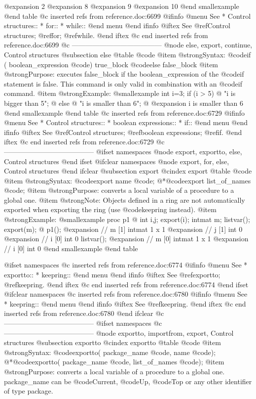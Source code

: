 {{{{{{{{@expansion{} 2
@expansion{} 8
@expansion{} 9
@expansion{} 10
@end smallexample
@end table
@c inserted refs from reference.doc:6699
@ifinfo
@menu
See
* Control structures::
* for::
* while::
@end menu
@end ifinfo
@iftex
See
@ref{Control structures};
@ref{for};
@ref{while}.
@end iftex
@c end inserted refs from reference.doc:6699
@c ---------------------------------------
@node else, export, continue, Control structures
@subsection else
@table @code
@item @strong{Syntax:}
@code{if (} boolean_expression @code{)} true_block @code{else} false_block
@item @strong{Purpose:}
executes false_block if the boolean_expression of the @code{if} statement
is false. This command is only valid in combination with an @code{if}
command.
@item @strong{Example:}
@smallexample
int i=3;
if (i > 5)
@{
  "i is bigger than 5";
@}
else
@{
  "i is smaller than 6";
@}
@expansion{} i is smaller than 6
@end smallexample
@end table
@c inserted refs from reference.doc:6729
@ifinfo
@menu
See
* Control structures::
* boolean expressions::
* if::
@end menu
@end ifinfo
@iftex
See
@ref{Control structures};
@ref{boolean expressions};
@ref{if}.
@end iftex
@c end inserted refs from reference.doc:6729
@c ---------------------------------------
@ifset namespaces
@node export, exportto, else, Control structures
@end ifset
@ifclear namespaces
@node export, for, else, Control structures
@end ifclear
@subsection export
@cindex export
@table @code
@item @strong{Syntax:}
@code{export} name @code{;}
@*@code{export} list_of_names @code{;}
@item @strong{Purpose:}
converts a local variable of a procedure to a global one.
@item @strong{Note:}
Objects defined in a ring are not automatically exported
when exporting the ring (use @code{keepring} instead).
@item @strong{Example:}
@smallexample
proc p1
@{
  int i,j;
  export(i);
  intmat m;
  listvar();
  export(m);
@}
p1();
@expansion{} // m                    [1]  intmat 1 x 1
@expansion{} // j                    [1]  int 0
@expansion{} // i                    [0]  int 0
listvar();
@expansion{} // m                    [0]  intmat 1 x 1
@expansion{} // i                    [0]  int 0
@end smallexample
@end table

@ifset namespaces
@c inserted refs from reference.doc:6774
@ifinfo
@menu
See
* exportto::
* keepring::
@end menu
@end ifinfo
@iftex
See
@ref{exportto};
@ref{keepring}.
@end iftex
@c end inserted refs from reference.doc:6774
@end ifset
@ifclear namespaces
@c inserted refs from reference.doc:6780
@ifinfo
@menu
See
* keepring::
@end menu
@end ifinfo
@iftex
See
@ref{keepring}.
@end iftex
@c end inserted refs from reference.doc:6780
@end ifclear
@c ---------------------------------------
@ifset namespaces
@c ---------------------------------------
@node exportto, importfrom, export, Control structures
@subsection exportto
@cindex exportto
@table @code
@item @strong{Syntax:}
@code{exportto(} package_name @code{, }name @code{);}
@*@code{exportto(} package_name @code{,} list_of_names @code{);}
@item @strong{Purpose:}
converts a local variable of a procedure to a global one.
package_name can be @code{Current}, @code{Up}, @code{Top} or any other
identifier of type package.

}}}}}}}}
